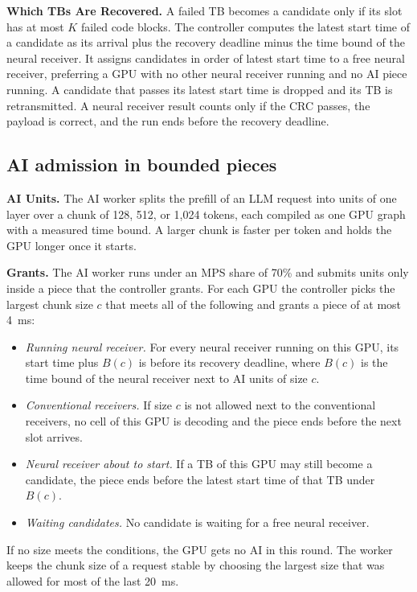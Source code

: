 \documentclass[acmsmall,screen,review,anonymous]{acmart}
\begin{document}
\noindent\textbf{Which TBs Are Recovered.} A failed TB becomes a candidate only if its slot has at most $K$
failed code blocks. The controller computes the latest start time of a candidate as its arrival plus the
recovery deadline minus the time bound of the neural receiver. It assigns candidates in order of latest
start time to a free neural receiver, preferring a GPU with no other neural receiver running and no AI piece
running. A candidate that passes its latest start time is dropped and its TB is retransmitted. A neural
receiver result counts only if the CRC passes, the payload is correct, and the run ends before the recovery
deadline.

\subsection{AI admission in bounded pieces}

\noindent\textbf{AI Units.} The AI worker splits the prefill of an LLM request into units of one layer over
a chunk of 128, 512, or 1,024 tokens, each compiled as one GPU graph with a measured time bound. A larger
chunk is faster per token and holds the GPU longer once it starts.

\noindent\textbf{Grants.} The AI worker runs under an MPS share of 70\% and submits units only inside a
piece that the controller grants. For each GPU the controller picks the largest chunk size $c$ that meets
all of the following and grants a piece of at most 4~ms:
\begin{itemize}
\item \emph{Running neural receiver.} For every neural receiver running on this GPU, its start time plus
$B(c)$ is before its recovery deadline, where $B(c)$ is the time bound of the neural receiver next to AI
units of size $c$.
\item \emph{Conventional receivers.} If size $c$ is not allowed next to the conventional receivers, no cell
of this GPU is decoding and the piece ends before the next slot arrives.
\item \emph{Neural receiver about to start.} If a TB of this GPU may still become a candidate, the piece
ends before the latest start time of that TB under $B(c)$.
\item \emph{Waiting candidates.} No candidate is waiting for a free neural receiver.
\end{itemize}
If no size meets the conditions, the GPU gets no AI in this round. The worker keeps the chunk size of a
request stable by choosing the largest size that was allowed for most of the last 20~ms.
\end{document}
